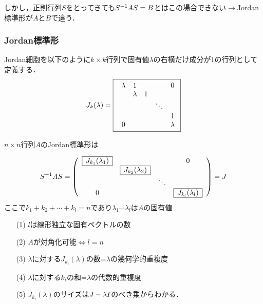 しかし，正則行列$S$をとってきても${S}^{-1}AS=B$とはこの場合できない$\to$Jordan標準形が$A$と$B$で違う．
\subsubsection{Jordan標準形}
Jordan細胞を以下のように$k\times k$行列で固有値$\lambda$の右横だけ成分が1の行列として定義する．
\begin{equation}
  J_k (\lambda )=\fbox{
  $\begin{array}{ccccc}
    \lambda&1&&&0\\
    &\lambda&1&&\\
    &&&\ddots&\\
    &&&&1\\
    0&&&&\lambda
  \end{array}$}
\end{equation}

$n\times n$行列$A$のJordan標準形は

\begin{equation}
  {S}^{-1}AS=\left( \begin{array}{cccc}
    \begin{array}{|c|} \hline {J_{k_1}({\lambda}_1 )}\\\hline \end{array}&&&0\\
    &\begin{array}{|c|} \hline {J_{k_2}({\lambda}_2 )}\\\hline \end{array}&&\\
    &&\ddots&\\
    0&&&\begin{array}{|c|} \hline {J_{k_l}({\lambda}_l )}\\\hline \end{array}
  \end{array}\right)=J
\end{equation}
ここで$k_1 +k_2 +\cdots +k_l =n$であり${\lambda}_1 \cdots {\lambda}_l$は$A$の固有値
\begin{itemize}
  \item[(1)]$l$は線形独立な固有ベクトルの数\\
  \item[(2)]$A$が対角化可能$\Leftrightarrow l=n$\\
  \item[(3)]$\lambda$に対する$J_{k_i}({\lambda} )$の数=$\lambda$の幾何学的重複度\\
  \item[(4)]$\lambda$に対する$k_i$の和=$\lambda$の代数的重複度\\
  \item[(5)]$J_{k_i}({\lambda} )$のサイズは$J-\lambda I$のべき乗からわかる．
\end{itemize}
